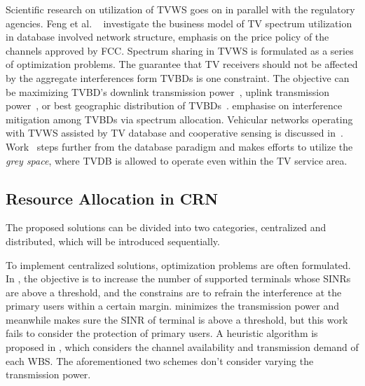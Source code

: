 Scientific research on utilization of TVWS goes on in parallel with the regulatory agencies.
Feng et al. ~\cite{hybridPricing_tvspace_2014} investigate the business model of TV spectrum utilization in database involved network structure, emphasis on the price policy of the channels approved by FCC.
Spectrum sharing in TVWS is formulated as a series of optimization problems. 
The guarantee that TV receivers should not be affected by the aggregate interferences form TVBDs is one constraint.
The objective can be maximizing TVBD's downlink transmission power~\cite{multipleIntf_pimrc11}, uplink transmission power~\cite{uplink_power_tvws13}, or best geographic distribution of TVBDs~\cite{withinTVcoverage_PIMRC13}.
\cite{game_CA_association_ICDCS12,SA_CA_TVWS_2012crowncom, 802.22co-existence09, 802.22game_08globecom,self-coexistenceWRAN2010infocom} emphasise on interference mitigation among TVBDs via spectrum allocation.
Vehicular networks operating with TVWS assisted by TV database and cooperative sensing is discussed in~\cite{tvws_vtc13}.
Work~\cite{increaseTVWS12} steps further from the database paradigm and makes efforts to utilize the \textit{grey space}, where TVDB is allowed to operate even within the TV service area.



\subsection{Resource Allocation in CRN}

The proposed solutions can be divided into two categories, centralized and distributed, which will be introduced sequentially.

To implement centralized solutions, optimization problems are often formulated.
In \cite{downlink-centralized-08-TWC}, the objective is to increase the number of supported terminals whose SINRs are above a threshold, and the constrains are to refrain the interference at the primary users within a certain margin.
\cite{joint_power_channel_linkpair_08ICT} minimizes the transmission power and meanwhile makes sure the SINR of terminal is above a threshold, but this work fails to consider the protection of primary users.
A heuristic algorithm is proposed in \cite{centralized_80222_sharing_ifip2011}, which considers the channel availability and transmission demand of each WBS.
The aforementioned two schemes don't consider varying the transmission power.


